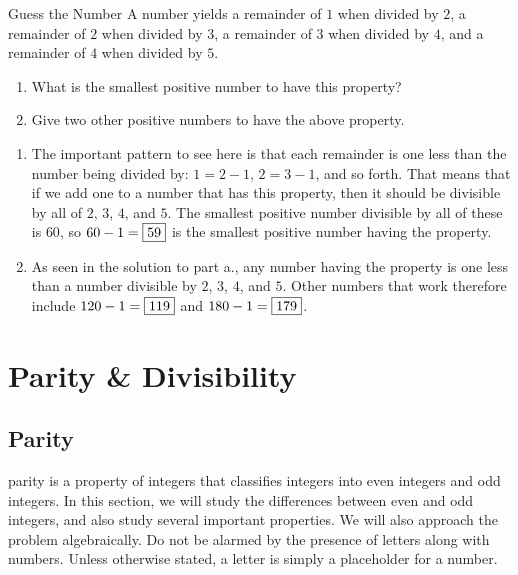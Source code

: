 \documentclass[a4paper,10pt]{report}
\begin{document}
\begin{problem}{Guess the Number}
 A number yields a remainder of \(1\) when divided by \(2\), a remainder of
 \(2\) when divided by \(3\), a remainder of \(3\) when divided by \(4\), and a
 remainder of \(4\) when divided by \(5\).

 \begin{enumerate}[\hspace{1cm}a.]
  \item What is the smallest positive number to have this property?
  \item Give two other positive numbers to have the above property.
 \end{enumerate}

 \begin{solution}
   \begin{enumerate}[\hspace{1cm}a.]
     \item The important pattern to see here is that each remainder is one less
     than the number being divided by: \(1 = 2 - 1\), \(2 = 3 - 1\), and so
     forth. That means that if we add one to a number that has this property,
     then it should be divisible by all of \(2\), \(3\), \(4\), and \(5\). The
     smallest positive number divisible by all of these is \(60\), so \(60 - 1
     = \Ans{59}\) is the smallest positive number having the property.
     \item As seen in the solution to part a., any number having the property
     is one less than a number divisible by \(2\), \(3\), \(4\), and \(5\).
     Other numbers that work therefore include \(120 - 1 = \Ans{119}\) and
     \(180 - 1 = \Ans{179}\).
   \end{enumerate}
 \end{solution}
\end{problem}

\chapter{Parity \& Divisibility}

\section{Parity}

\Gls{parity} is a property of integers that classifies integers into even
integers and odd integers. In this section, we will study the differences
between even and odd integers, and also study several important properties. We
will also approach the problem algebraically. Do not be alarmed by the presence
of letters along with numbers. Unless otherwise stated, a letter is simply a
placeholder for a number.
\end{document}
